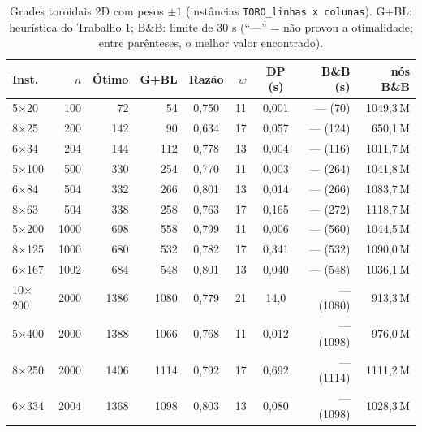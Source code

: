 \begin{table}[ht]\centering\small
\caption{Grades toroidais 2D com pesos $\pm1$ (inst\^ancias \texttt{TORO\_linhas x colunas}). G+BL: heur\'istica do Trabalho 1; B\&B: limite de 30 s (``---'' = n\~ao provou a otimalidade; entre par\^enteses, o melhor valor encontrado).}\label{tab:toro}
\begin{tabular}{lrrrcrcrr}\hline
Inst. & $n$ & \'Otimo & G+BL & Raz\~ao & $w$ & DP (s) & B\&B (s) & n\'os B\&B \\\hline
5$\times$20 & 100 & 72 & 54 & 0{,}750 & 11 & 0{,}001 & --- (70) & 1049{,}3\,M \\
8$\times$25 & 200 & 142 & 90 & 0{,}634 & 17 & 0{,}057 & --- (124) & 650{,}1\,M \\
6$\times$34 & 204 & 144 & 112 & 0{,}778 & 13 & 0{,}004 & --- (116) & 1011{,}7\,M \\
5$\times$100 & 500 & 330 & 254 & 0{,}770 & 11 & 0{,}003 & --- (264) & 1041{,}8\,M \\
6$\times$84 & 504 & 332 & 266 & 0{,}801 & 13 & 0{,}014 & --- (266) & 1083{,}7\,M \\
8$\times$63 & 504 & 338 & 258 & 0{,}763 & 17 & 0{,}165 & --- (272) & 1118{,}7\,M \\
5$\times$200 & 1000 & 698 & 558 & 0{,}799 & 11 & 0{,}006 & --- (560) & 1044{,}5\,M \\
8$\times$125 & 1000 & 680 & 532 & 0{,}782 & 17 & 0{,}341 & --- (532) & 1090{,}0\,M \\
6$\times$167 & 1002 & 684 & 548 & 0{,}801 & 13 & 0{,}040 & --- (548) & 1036{,}1\,M \\
10$\times$200 & 2000 & 1386 & 1080 & 0{,}779 & 21 & 14{,}0 & --- (1080) & 913{,}3\,M \\
5$\times$400 & 2000 & 1388 & 1066 & 0{,}768 & 11 & 0{,}012 & --- (1098) & 976{,}0\,M \\
8$\times$250 & 2000 & 1406 & 1114 & 0{,}792 & 17 & 0{,}692 & --- (1114) & 1111{,}2\,M \\
6$\times$334 & 2004 & 1368 & 1098 & 0{,}803 & 13 & 0{,}080 & --- (1098) & 1028{,}3\,M \\
\hline\end{tabular}\end{table}
